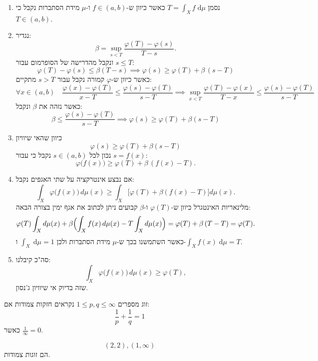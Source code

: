 \documentclass{tstextbook}
\begin{document}
\begin{enumerate}
  \item נסמן \(T=\int _{X}f \;\mathrm{d}\mu\) כאשר כיוון ש-\(f \in (a,b)\) ו-\(\mu\) מידת הסתברות נקבל כי \(T \in (a,b)\). 


  \item נגדיר: 
$$\beta=\operatorname*{sup}_{s<T}{\frac{\varphi(T)-\varphi(s)}{T-s}}.$$
ונקבל מהדרישה של הסופרמום עבור \(s\leq T\):
$$\varphi(T)-\varphi(s)\leq\beta(T-s)\implies\varphi(s)\geq\varphi(T)+\beta\,(s-T)$$
כאשר כיוון ש-\(\varphi\) קמורה נקבל עבור \(s> T\) מתקיים:
$$\forall x \in (a,b) \quad \frac{\varphi(x)-\varphi(T)}{x-T}\leq\frac{\varphi\left( s \right)-\varphi(T)}{s-T}\implies \sup _{x <T}\frac{\varphi(T)-\varphi(x)}{T-x}\leq \frac{\varphi(s)-\varphi(T)}{s-T}$$
כאשר נזהה את \(\beta\) ונקבל:
$$\beta \leq \frac{\varphi(s)-\varphi(T)}{s-T}\implies \varphi(s)\geq \varphi(T)+\beta(s-T)$$


  \item כיוון שהאי שיוויון\\
$$\varphi(s)\geq\varphi(T)+\beta\left(s-T\right)$$
נכון לכל \(s \in (a,b)\) נקבל כי עבור \(s=f(x)\):
$$\varphi{\big(}f(x){\big)}\geq\varphi(T)+\beta\,(f(x)-T).$$


  \item אם נבצע אינטרקציה על שתי האגפים נקבל: 
$$\int_{X}\varphi\big(f(x)\big)\,d\mu(x)\geq\int_{X}\Big[\varphi(T)+\beta\left(f(x)-T\right)\Big]d\mu(x).$$
מלינאריות האינטגרל כיוון ש-\(\varphi(T)\) ו-\(\beta\) קבועים ניתן לכתוב את אגף ימין בצורה הבאה:
$$\varphi(T)\int_{X}d\mu(x)+\beta\Bigl(\int_{X}f(x)\,d\mu(x)-T\int_{X}d\mu(x)\Bigr)=\varphi(T)+\beta\,(T-T)=\varphi(T).$$
כאשר השתמשנו בכך ש-\(\mu\) מידת הסתברות ולכן \(\int _{X} \;\mathrm{d} \mu=1\) ו-\(\int _{X}f(x) \;\mathrm{d} \mu=T\).


  \item סה"כ קיבלנו: 
$$\int_{X}\varphi{\big(}f(x){\big)}\,d\mu(x)\geq\varphi(T),$$
שזה בדיוק אי שיוויון ג'נסון.


\end{enumerate}
\begin{definition}
זוג מספרים \(1\leq p,q\leq \infty\) נקראים חזקות צמודות אם:
$$\frac{1}{p}+\frac{1}{q}=1$$
כאשר \(\frac{1}{\infty}=0\).

\end{definition}
\begin{example}
$$(2,2),\left( 1,\infty \right)$$
הם זוגות צמודות.

\end{example}
\end{document}
